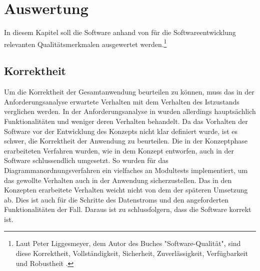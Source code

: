 \chapter{Auswertung}
\label{chap:auswertung}
In diesem Kapitel soll die Software anhand von für die Softwareentwicklung relevanten Qualitätsmerkmalen
ausgewertet werden.\footnote{Laut Peter Liggesmeyer, dem Autor des Buches "Software-Qualität", sind diese
Korrektheit, Vollständigkeit, Sicherheit, Zuverlässigkeit, Verfügbarkeit und Robustheit \cite[S. 5]{SoftwareQualitaet}.}

\section{Korrektheit}
\label{sec:korrektheit}
Um die Korrektheit der Gesamtanwendung beurteilen zu können, muss das in der Anforderungsanalyse erwartete
Verhalten mit dem Verhalten des Istzustands verglichen werden. In der Anforderungsanalyse
in  wurden allerdings hauptsächlich Funktionalitäten und weniger deren 
Verhalten behandelt. Da das Vorhalten der Software vor der Entwicklung des Konzepts nicht klar definiert wurde,
ist es schwer, die Korrektheit der Anwendung zu beurteilen. Die in der Konzeptphase erarbeiteten Verfahren
wurden, wie in dem Konzept entworfen, auch in der Software schlussendlich umgesetzt. So wurden für
das Diagrammanordnungsverfahren ein vielfaches an Modultests implementiert, um das gewollte Verhalten auch in
der Anwendung sicherzustellen. Das in den Konzepten erarbeitete Verhalten weicht nicht von dem der späteren
Umsetzung ab. Dies ist auch für die Schritte des Datenstroms und den angeforderten Funktionalitäten der Fall.
Daraus ist zu schlussfolgern, dass die Software korrekt ist.

